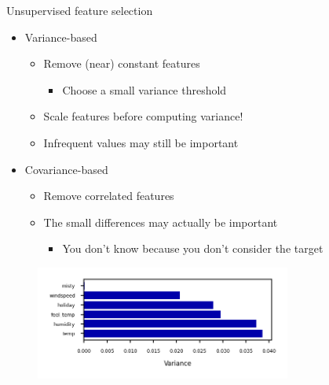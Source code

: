 \begin{frame}[allowframebreaks]{Unsupervised feature selection}
\begin{itemize}
    \item Variance-based
    \begin{itemize}
        \item Remove (near) constant features
        \begin{itemize}
            \item Choose a small variance threshold
        \end{itemize}
        \item Scale features before computing variance!
        \item Infrequent values may still be important
    \end{itemize}

    \item Covariance-based
    \begin{itemize}
        \item Remove correlated features
        \item The small differences may actually be important
        \begin{itemize}
            \item You don't know because you don't consider the target
        \end{itemize}
    \end{itemize}
\end{itemize}

\begin{figure}
    \centering
    \includegraphics[width=0.75\textwidth,keepaspectratio]{images/pre-processing/variance-based.png}
\end{figure}
\end{frame}

